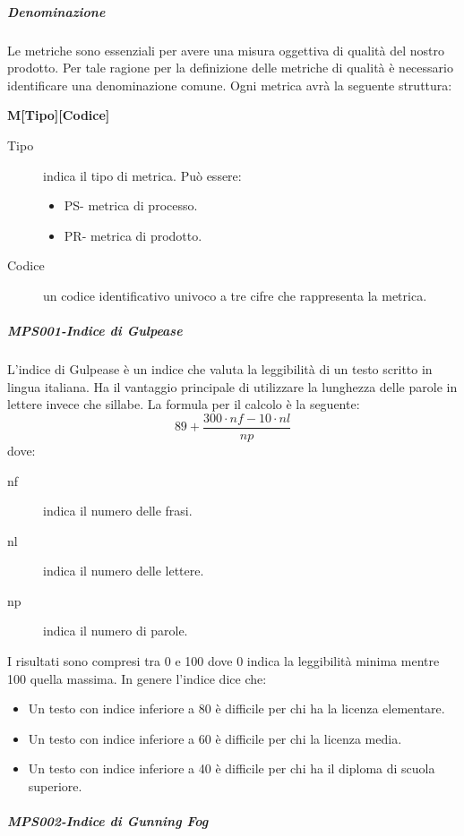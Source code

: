 \documentclass[../norme-di-progetto.tex]{subfiles}
\begin{document}
\subparagraph{Denominazione}%
\label{subp:denominazione}
Le metriche sono essenziali per avere una misura oggettiva di qualità del nostro prodotto.
Per tale ragione per la definizione delle metriche di qualità è necessario identificare una denominazione comune.
Ogni metrica avrà la seguente struttura:
\begin{center}
          \textbf{M[Tipo][Codice]}
\end{center}
\begin{description}
  \item [Tipo] indica il tipo di metrica. Può essere:
  \begin{itemize}
      \item PS- metrica di processo.
      \item PR- metrica di prodotto.
  \end{itemize}
  \item [Codice] un codice identificativo univoco a tre cifre che rappresenta la metrica.
\end{description}


\subparagraph{MPS001-Indice di Gulpease}%
\label{subp:MPS001-indice_di_Gulpease}

L'indice di Gulpease è un indice che valuta la leggibilità di un testo scritto in lingua italiana. Ha il vantaggio principale di utilizzare la lunghezza delle parole in lettere invece che sillabe. La formula per il calcolo è la seguente:
\[
    89 +\frac{300\cdot nf-10\cdot nl}{np}
\]
dove:
\begin{description}
  \item [nf] indica il numero delle frasi.
  \item [nl] indica il numero delle lettere.
  \item [np] indica il numero di parole.
\end{description}
I risultati sono compresi tra 0 e 100 dove 0 indica la leggibilità minima mentre 100 quella massima. In genere l'indice dice che:
\begin{itemize}
  \item Un testo con indice inferiore a 80 è difficile per chi ha la licenza elementare.
  \item Un testo con indice inferiore a 60 è difficile per chi la licenza media.
  \item Un testo con indice inferiore a 40 è difficile per chi ha il diploma di scuola superiore.
\end{itemize}
\subparagraph{MPS002-Indice di Gunning Fog}%
\label{subp:MPS002-indice_di_Gunning_Fog}
\end{document}
